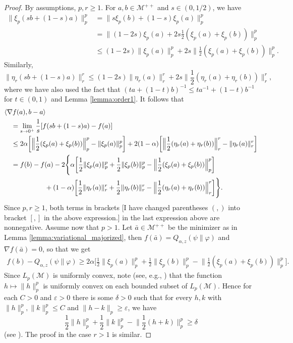\documentclass[12pt]{article}
\theoremstyle{definition}
\theoremstyle{remark}
\numberwithin{equation}{section}
\def\Me{\mathcal M}
\def\<{\langle}
\def\>{\rangle}
\begin{document}
\begin{proof} By assumptions, $p,r\ge 1$.  For
$a,b\in \Me^{++}$ and $s\in (0,1/2)$, we have
\begin{align*}
\|\xi_p(sb+(1-s)a)\|_p^p&=\|s\xi_p(b)+(1-s)\xi_p(a)\|_p^p\\
&=\Big\|(1-2s)\xi_p(a)+2s\frac12(\xi_p(a)+\xi_p(b))\Big\|_p^p\\
&\le (1-2s)\|\xi_p(a)\|_p^p+2s\Big\|\frac12(\xi_p(a)+\xi_p(b))\Big\|_p^p.
\end{align*}
Similarly,
\[
\|\eta_r(sb+(1-s)a)\|_r^r\le
(1-2s)\|\eta_r(a)\|_r^r+2s\Big\|\frac12(\eta_r(a)+\eta_r(b))\Big\|_r^r,
\]
where we have also used the fact that $(t a+(1-t)b)^{-1}\le t
a^{-1}+(1-t)b^{-1}$ for $t\in (0,1)$ and Lemma \ref{lemma:order1}. It follows that
\begin{align*}
&\<\nabla f(a),b-a\>\\
&\quad=\lim_{s\to 0^+} {1\over s}[ f(sb+(1-s)a)-f(a)]\\
&\quad\le 2\alpha\biggl[\Big\|\frac12(\xi_p(a)+\xi_p(b))\Big\|_p^p-\|\xi_p(a)\|_p^p\biggr]
+2(1-\alpha)\biggl[\Big\|\frac12(\eta_r(a)+\eta_r(b))\Big\|_r^r-\|\eta_r(a)\|_r^r\biggr]\\
&\quad=f(b)-f(a)-2\Biggl\{\alpha\biggl[\frac12 \|\xi_p(a)\|_p^p
+\frac12 \|\xi_p(b)\|_p^p-\Big\|\frac12(\xi_p(a)+\xi_p(b))\Big\|_p^p\biggr]\\
&\qquad\qquad\qquad+(1-\alpha)\biggl[\frac12 \|\eta_r(a)\|_r^r+\frac12 \|\eta_r(b)\|_r^r
-\Big\|\frac12(\eta_r(a)+\eta_r(b))\Big\|_r^r\biggr]\Biggr\}.
\end{align*}
Since $p,r\ge 1$, both terms in brackets
{\color{red}[I have changed parentheses $(,)$ into bracket $[,]$ in the above expression.]}
in the last expression above are nonnegative. Assume now that $p>1$. 
Let $\bar a\in \Me^{++}$ be the minimizer as in Lemma \ref{lemma:variational_majorized},
then $f(\bar a)=Q_{\alpha,z}(\psi\|\varphi)$ and $\nabla f(\bar a)=0$, so that we get
\begin{align*}
f(b)-Q_{\alpha,z}(\psi\|\varphi)\ge 2\alpha\biggl[\frac12 \|\xi_p(a)\|_p^p+\frac12 \|\xi_p(b)\|_p^p
-\Big\|\frac12(\xi_p(a)+\xi_p(b))\Big\|_p^p\biggr].
\end{align*}
Since $L_p(\Me)$ is uniformly convex, note (see, e.g., \cite[Thmeorem 3.7.7]{zalinescu2002convex})
that the function $h\mapsto \|h\|_p^p$ is uniformly convex on each bounded subset of $L_p(\Me)$.
Hence for each $C>0$ and $\varepsilon>0$ there is some $\delta>0$ such that for every $h,k$
with $\|h\|_p^p,\|k\|_p^p\le C$ and $\|h-k\|_p\ge \varepsilon$, we have
\[
\frac12\|h\|_p^p+\frac12\|k\|_p^p-\Big\|\frac12(h+k)\Big\|_p^p\ge \delta
\]
(see \cite[p.~288, Exercise 3.3]{zalinescu2002convex}).  The proof in the case $r>1$ is similar. 
\end{proof}
\end{document}
